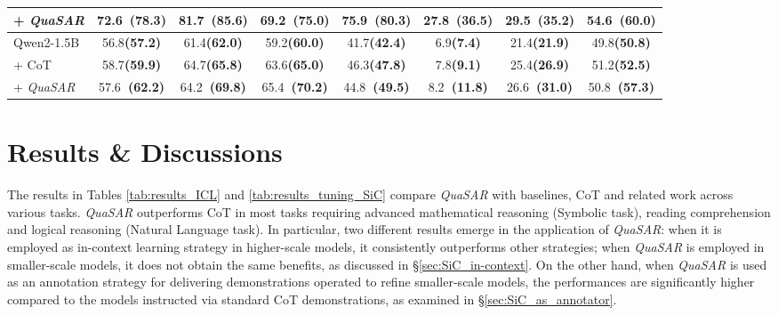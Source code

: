 \documentclass[11pt]{article}
\newcommand{\bcol}[1]{\fontsize{8.5}{42}\selectfont\textbf{(#1)}}
\newcommand{\gcol}[1]{{\bf \fontsize{8.5}{42}\selectfont \color{citecolor!80}~(#1)}}
\newcommand{\QuaSAR}{\emph{QuaSAR}\xspace}
\begin{document}
\begin{table*}[h]
{\begin{tabular}{lccccccc}
+ \QuaSAR & 72.6\gcol{78.3} & 81.7\gcol{85.6} & 69.2\gcol{75.0} & 75.9\gcol{80.3} & 27.8\gcol{36.5} & 29.5\gcol{35.2} & 54.6\gcol{60.0} \\ 

\midrule


Qwen2-1.5B & 56.8\bcol{57.2} & 61.4\bcol{62.0} & 59.2\bcol{60.0} & 41.7\bcol{42.4} & 6.9\bcol{7.4} & 21.4\bcol{21.9} & 49.8\bcol{50.8} \\


+ CoT & 58.7\bcol{59.9} & 64.7\bcol{65.8} & 63.6\bcol{65.0} & 46.3\bcol{47.8} & 7.8\bcol{9.1} & 25.4\bcol{26.9} & 51.2\bcol{52.5} \\


+ \QuaSAR & 57.6\gcol{62.2} & 64.2\gcol{69.8} & 65.4\gcol{70.2} & 44.8\gcol{49.5} & 8.2\gcol{11.8} & 26.6\gcol{31.0} & 50.8\gcol{57.3} \\ 


\bottomrule
\end{tabular}
}
\caption{Performance comparison using \QuaSAR, CoT \cite{kojima2022large}, FLARE \cite{arakelyan2024flarefaithfullogicaidedreasoning} and, CoMAT \cite{leang2024comatchainmathematicallyannotated}as in-context learning strategies. Moreover, we report in brackets the performances obtained using these strategies as annotation approaches for tuning models (complete table in Appendix \ref{app:results_tuning_SiC_complete}).}
\label{tab:results_tuning_SiC}
\end{table*}



\section{Results \& Discussions}
The results in Tables \ref{tab:results_ICL} and \ref{tab:results_tuning_SiC} compare \QuaSAR with baselines, CoT and related work across various tasks. 
\QuaSAR outperforms CoT in most tasks requiring advanced mathematical reasoning (Symbolic task), reading comprehension and logical reasoning (Natural Language task).
In particular, two different results emerge in the application of \QuaSAR: when it is employed as in-context learning strategy in higher-scale models, it consistently outperforms other strategies; when \QuaSAR is employed in smaller-scale models, it does not obtain the same benefits, as discussed in \S \ref{sec:SiC_in-context}. 
On the other hand, when \QuaSAR is used as an annotation strategy for delivering demonstrations operated to refine smaller-scale models, the performances are significantly higher compared to the models instructed via standard CoT demonstrations, as examined in \S \ref{sec:SiC_as_annotator}. 
\end{document}
